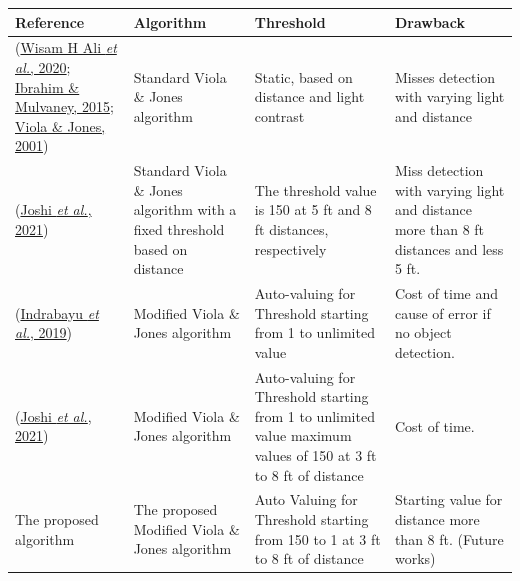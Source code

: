\documentclass[9pt]{extarticle}
\renewcommand{\small}{\fontsize{8pt}{8pt}\selectfont}
\begin{document}
\begin{minipage}{\linewidth}
\centering
\hypertarget{tab:1}{}
\vspace{-6pt}
\small
\begin{tabularx}{\linewidth}{@{}>{\raggedright\arraybackslash\hsize=0.78\hsize}X>{\raggedright\arraybackslash\hsize=0.93\hsize}X>{\raggedright\arraybackslash\hsize=1.26\hsize}X>{\raggedright\arraybackslash\hsize=1.03\hsize}X@{}}
\toprule
\textbf{Reference} & \textbf{Algorithm} & \textbf{Threshold} & \textbf{Drawback} \\ \midrule
(\hyperlink{ref:1}{Wisam H Ali \textit{et al.}, 2020}; \hyperlink{ref:5}{Ibrahim \& Mulvaney, 2015}; \hyperlink{ref:20}{Viola \& Jones, 2001}) & Standard Viola \& Jones algorithm & Static, based on distance and light contrast & Misses detection with varying light and distance \\ \addlinespace[0.3em]
(\hyperlink{ref:7}{Joshi \textit{et al.}, 2021}) & Standard Viola \& Jones algorithm with a fixed threshold based on distance & The threshold value is 150 at 5 ft and 8 ft distances, respectively & Miss detection with varying light and distance more than 8 ft distances and less 5 ft. \\ \addlinespace[0.3em]
(\hyperlink{ref:6}{Indrabayu \textit{et al.}, 2019}) & Modified Viola \& Jones algorithm & Auto-valuing for Threshold starting from 1 to unlimited value & Cost of time and cause of error if no object detection. \\ \addlinespace[0.3em]
(\hyperlink{ref:7}{Joshi \textit{et al.}, 2021}) & Modified Viola \& Jones algorithm & Auto-valuing for Threshold starting from 1 to unlimited value maximum values of 150 at 3 ft to 8 ft of distance & Cost of time. \\ \addlinespace[0.3em]
The proposed algorithm & The proposed Modified Viola \& Jones algorithm & Auto Valuing for Threshold starting from 150 to 1 at 3 ft to 8 ft of distance & Starting value for distance more than 8 ft. (Future works) \\
\bottomrule
\end{tabularx}
\end{minipage}
\par\vspace{6pt}
\end{document}
